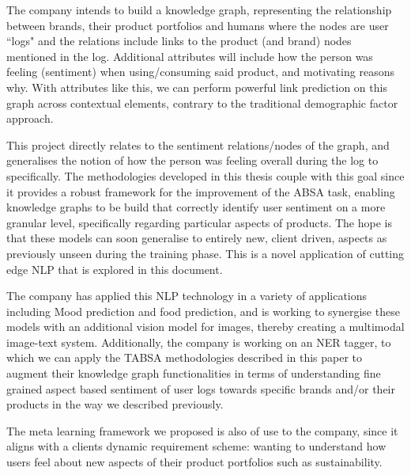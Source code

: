 \documentclass[11pt]{report}
\theoremstyle{Definition}
\theoremstyle{remark}
\begin{document}
The company intends to build a knowledge graph, representing the relationship between brands, their product portfolios and humans where the nodes are user ``logs" and the relations include links to the product (and brand) nodes mentioned in the log. Additional attributes will include how the person was feeling (sentiment) when using/consuming said product, and motivating reasons why. With attributes like this, we can perform powerful link prediction on this graph across contextual elements, contrary to the traditional demographic factor approach.

This project directly relates to the sentiment relations/nodes of the graph, and generalises the notion of how the person was feeling overall during the log to specifically. The methodologies developed in this thesis couple with this goal since it provides a robust framework for the improvement of the ABSA task, enabling knowledge graphs to be build that correctly identify user sentiment on a more granular level, specifically regarding particular aspects of products. The hope is that these models can soon generalise to entirely new, client driven, aspects as previously unseen during the training phase. This is a novel application of cutting edge NLP that is explored in this document.

The company has applied this NLP technology in a variety of applications including Mood prediction and food prediction, and is working to synergise these models with an additional vision model for images, thereby creating a multimodal image-text system. Additionally, the company is working on an NER tagger, to which we can apply the TABSA methodologies described in this paper to augment their knowledge graph functionalities in terms of understanding fine grained aspect based sentiment of user logs towards specific brands and/or their products in the way we described previously.

The meta learning framework we proposed is also of use to the company, since it aligns with a clients dynamic requirement scheme: wanting to understand how users feel about new aspects of their product portfolios such as sustainability. 
\end{document}
